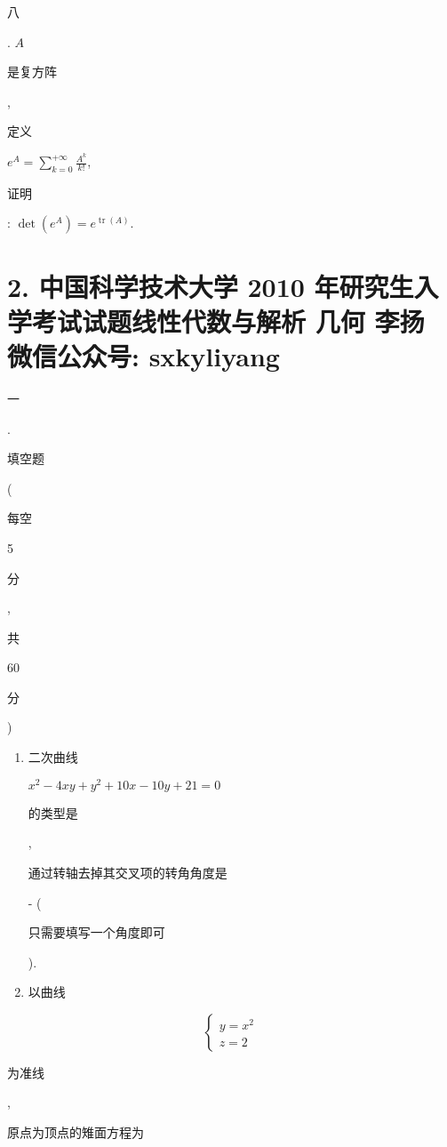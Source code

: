 \documentclass[10pt]{article}
\begin{document}
\begin{CJK}{UTF8}{mj}八\end{CJK}. $A$ \begin{CJK}{UTF8}{mj}是复方阵\end{CJK}, \begin{CJK}{UTF8}{mj}定义\end{CJK} $e^{A}=\sum_{k=0}^{+\infty} \frac{A^{k}}{k !}$, \begin{CJK}{UTF8}{mj}证明\end{CJK}: $\operatorname{det}\left(e^{A}\right)=e^{\operatorname{tr}(A)}$.

\section{2. 中国科学技术大学 2010 年研究生入学考试试题线性代数与解析 几何 
 李扬 
 微信公众号: sxkyliyang}
\begin{CJK}{UTF8}{mj}一\end{CJK}. \begin{CJK}{UTF8}{mj}填空题\end{CJK}(\begin{CJK}{UTF8}{mj}每空\end{CJK} 5 \begin{CJK}{UTF8}{mj}分\end{CJK}, \begin{CJK}{UTF8}{mj}共\end{CJK} 60 \begin{CJK}{UTF8}{mj}分\end{CJK})

\begin{enumerate}
  \item \begin{CJK}{UTF8}{mj}二次曲线\end{CJK} $x^{2}-4 x y+y^{2}+10 x-10 y+21=0$ \begin{CJK}{UTF8}{mj}的类型是\end{CJK} , \begin{CJK}{UTF8}{mj}通过转轴去掉其交叉项的转角角度是\end{CJK} - (\begin{CJK}{UTF8}{mj}只需要填写一个角度即可\end{CJK}).

  \item \begin{CJK}{UTF8}{mj}以曲线\end{CJK}

\end{enumerate}
$$
\left\{\begin{array}{l}
y=x^{2} \\
z=2
\end{array}\right.
$$
\begin{CJK}{UTF8}{mj}为准线\end{CJK}, \begin{CJK}{UTF8}{mj}原点为顶点的雉面方程为\end{CJK}
\end{document}
